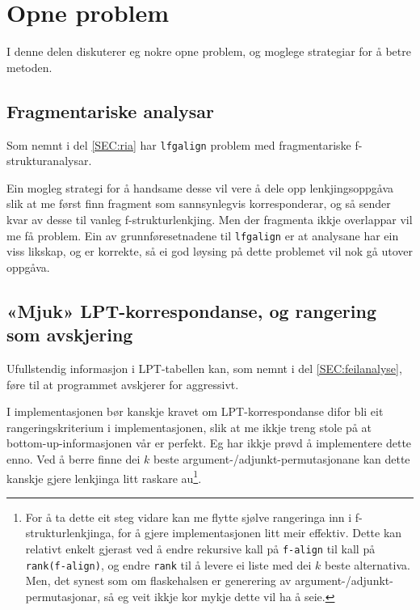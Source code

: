 \documentclass[11pt,a4paper,oneside,draft]{book}
\begin{document}
\section{Opne problem}
\label{sec-5.4}

   \label{SEC:opneproblem}

I denne delen diskuterer eg nokre opne problem, og moglege strategiar
for å betre metoden.

\subsection{Fragmentariske analysar}
\label{sec-5.4.1}

Som nemnt i del \ref{SEC:ria} har \texttt{lfgalign} problem med
fragmentariske f-strukturanalysar. 

Ein mogleg strategi for å handsame desse vil vere å dele opp
lenkjingsoppgåva slik at me først finn fragment som sannsynlegvis
korresponderar, og så sender kvar av desse til vanleg
f-strukturlenkjing. Men der fragmenta ikkje overlappar vil me få
problem. Ein av grunnføresetnadene til \texttt{lfgalign} er at analysane har
ein viss likskap, og er korrekte, så ei god løysing på dette problemet
vil nok gå utover oppgåva. 


\subsection{«Mjuk» LPT-korrespondanse, og rangering som avskjering}
\label{sec-5.4.2}

Ufullstendig informasjon i LPT-tabellen kan, som nemnt i del
\ref{SEC:feilanalyse}, føre til at programmet avskjerer for
aggressivt.

I implementasjonen bør kanskje kravet om LPT-korrespondanse difor bli
eit rangeringskriterium i implementasjonen, slik at me ikkje treng
stole på at bottom-up-informasjonen vår er perfekt. Eg har ikkje prøvd
å implementere dette enno. Ved å berre finne dei $k$ beste
argument-/adjunkt-permutasjonane kan dette kanskje gjere lenkjinga
litt raskare au\footnote{For å ta dette eit steg vidare kan me flytte sjølve rangeringa
        inn i f-strukturlenkjinga, for å gjere implementasjonen litt
        meir effektiv. Dette kan relativt enkelt gjerast ved å endre
        rekursive kall på \texttt{f-align} til kall på \texttt{rank(f-align)}, og
        endre \texttt{rank} til å levere ei liste med dei $k$ beste
        alternativa. Men, det synest som om flaskehalsen er generering
        av argument-/adjunkt-permutasjonar, så eg veit ikkje kor mykje
        dette vil ha å seie. }.
\end{document}
